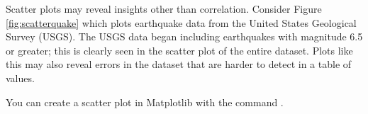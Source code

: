 Scatter plots may reveal insights other than correlation.
Consider Figure \ref{fig:scatterquake} which plots earthquake data from the United States Geological Survey (USGS).
The USGS data began including earthquakes with magnitude 6.5 or greater; this is clearly seen
in the scatter plot of the entire dataset.
Plots like this may also reveal errors in the dataset that are harder to detect in a table of values.

You can create a scatter plot in Matplotlib with the command .

